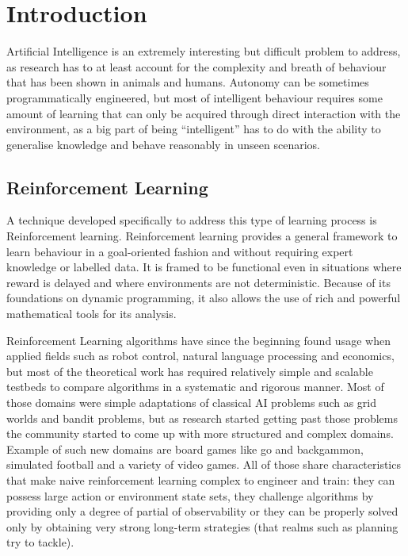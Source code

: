 
\chapter{Introduction}

Artificial Intelligence is an extremely interesting but difficult problem to
address, as research has to at least account for the complexity and breath of
behaviour that has been shown in animals and humans. Autonomy can be sometimes
programmatically engineered, but most of intelligent behaviour requires some
amount of learning that can only be acquired through direct interaction with the
environment, as a big part of being ``intelligent'' has to do with the ability
to generalise knowledge and behave reasonably in unseen scenarios.

\section{Reinforcement Learning}

A technique developed specifically to address this type of learning process is
Reinforcement learning. Reinforcement learning provides a general framework
to learn behaviour in a goal-oriented fashion and without requiring expert
knowledge or labelled data. It is framed to be functional even in situations
where reward is delayed and where environments are not deterministic. Because of
its foundations on dynamic programming, it also allows the use of rich and
powerful mathematical tools for its analysis.

Reinforcement Learning algorithms have since the beginning found usage when
applied fields such as robot control, natural language processing and economics,
but most of the theoretical work has required relatively simple and scalable
testbeds to compare algorithms in a systematic and rigorous manner. Most of
those domains were simple adaptations of classical AI problems such as grid
worlds and bandit problems, but as research started getting past those problems
the community started to come up with more structured and complex domains.
Example of such new domains are board games like go and backgammon, simulated
football and a variety of video games. All of those share characteristics that
make naive reinforcement learning complex to engineer and train: they can
possess large action or environment state sets, they challenge algorithms by
providing only a degree of partial of observability or they can be properly
solved only by obtaining very strong long-term strategies (that realms such as
planning try to tackle).

